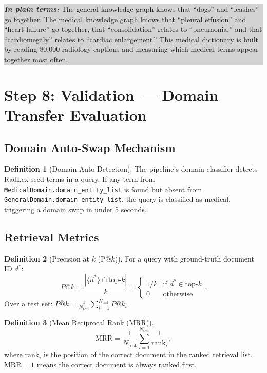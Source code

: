 \documentclass[12pt, a4paper]{article}
\theoremstyle{definition}
\newtheorem{definition}{Definition}[section]
\theoremstyle{plain}
\theoremstyle{remark}
\newcommand{\layman}[1]{%
  \vspace{4pt}%
  \noindent\colorbox{lightgray}{\parbox{\dimexpr\linewidth-2\fboxsep}{%
    \textbf{\textit{In plain terms:}} #1}}%
  \vspace{4pt}%
}
\begin{document}
\layman{The general knowledge graph knows that ``dogs'' and ``leashes'' go together. The medical knowledge graph knows that ``pleural effusion'' and ``heart failure'' go together, that ``consolidation'' relates to ``pneumonia,'' and that ``cardiomegaly'' relates to ``cardiac enlargement.'' This medical dictionary is built by reading 80,000 radiology captions and measuring which medical terms appear together most often.}

\section{Step 8: Validation --- Domain Transfer Evaluation}
\label{sec:eval}

\subsection{Domain Auto-Swap Mechanism}

\begin{definition}[Domain Auto-Detection]
The pipeline's domain classifier detects RadLex-seed terms in a query. If any term from \texttt{MedicalDomain.domain\_entity\_list} is found but absent from \texttt{GeneralDomain.domain\_entity\_list}, the query is classified as medical, triggering a domain swap in under 5 seconds.
\end{definition}

\subsection{Retrieval Metrics}

\begin{definition}[Precision at $k$ (P@$k$)]
For a query with ground-truth document ID $d^*$:
\[
P@k = \frac{|\{d^*\} \cap \text{top-}k|}{k} = \begin{cases} 1/k & \text{if } d^* \in \text{top-}k \\ 0 & \text{otherwise} \end{cases}.
\]
Over a test set: $\overline{P@k} = \frac{1}{N_{\text{test}}} \sum_{i=1}^{N_{\text{test}}} P@k_i$.
\end{definition}

\begin{definition}[Mean Reciprocal Rank (MRR)]
\[
\text{MRR} = \frac{1}{N_{\text{test}}} \sum_{i=1}^{N_{\text{test}}} \frac{1}{\text{rank}_i},
\]
where $\text{rank}_i$ is the position of the correct document in the ranked retrieval list. $\text{MRR} = 1$ means the correct document is always ranked first.
\end{definition}
\end{document}
